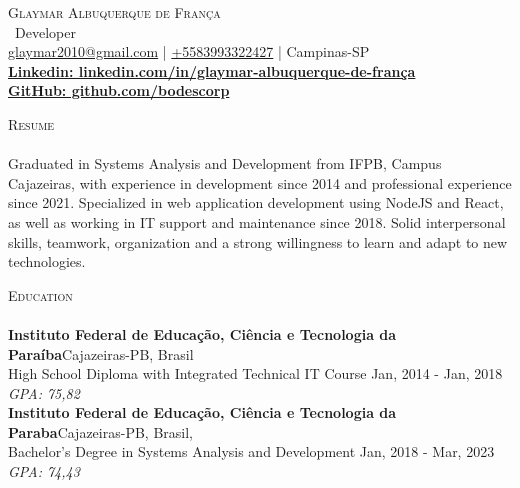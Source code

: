 \documentclass[a4paper]{article}
\newcommand{\lineunder} {
    \vspace*{-8pt} \\
    \hspace*{-18pt} \hrulefill \\
}
\newcommand{\header} [1] {
    {\hspace*{-18pt}\vspace*{6pt} \textsc{#1}}
    \vspace*{-6pt} \lineunder
}
\begin{document}
\vspace*{-40pt}



%
%
\vspace*{-2pt}
\begin{center}
    {\Huge \scshape {Glaymar Albuquerque de França}}\\
    \vspace*{2pt}
    \ {Developer}\\
    \vspace*{2pt}
    \href{mailto:glaymar2010@gmail.com}{glaymar2010@gmail.com} | \href{https://wa.me/+5583993322427}{+5583993322427} | Campinas-SP\\
    \vspace*{2pt}
    \textbf{\href{https://www.linkedin.com/in/glaymar-albuquerque-de-fran\%C3\%A7a/}{Linkedin: linkedin.com/in/glaymar-albuquerque-de-frança }} \\
    \textbf{\href{https://github.com/bodescorp}{GitHub: github.com/bodescorp }} \\
\end{center}

%
%
\header{Resume}
\vspace{2mm}
Graduated in Systems Analysis and Development from IFPB, Campus Cajazeiras, with experience in development since 2014 and professional experience since 2021.
Specialized in web application development using NodeJS and React, as well as working in IT support and maintenance since 2018.
Solid interpersonal skills, teamwork, organization and a strong willingness to learn and adapt to new technologies.
\vspace{2mm}


%
%
\header{Education}
\vspace{2mm}
\textbf{Instituto Federal de Educação, Ciência e Tecnologia da Paraíba}\hfill Cajazeiras-PB, Brasil\\
High School Diploma with Integrated Technical IT Course \hfill Jan, 2014 - Jan, 2018\\
{\sl GPA: 75,82}\\
\vspace{2mm}
\textbf{Instituto Federal de Educação, Ciência e Tecnologia da Paraba}\hfill Cajazeiras-PB, Brasil,\\
Bachelor's Degree in Systems Analysis and Development \hfill Jan, 2018 - Mar, 2023\\
{\sl GPA: 74,43}\\
\vspace{2mm}
\end{document}
